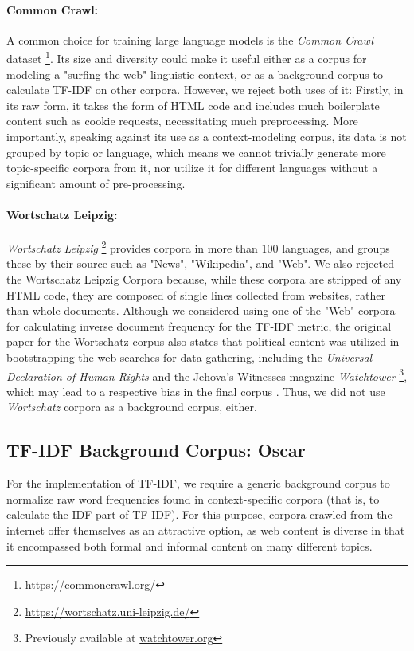 \paragraph{Common Crawl:}
A common choice for training large language models is the \textit{Common Crawl} dataset \footnote{\url{https://commoncrawl.org/}}.
Its size and diversity could make it useful either as a corpus for modeling a "surfing the web" linguistic context, or as a background corpus to calculate TF-IDF on other corpora.
However, we reject both uses of it:
Firstly, in its raw form, it takes the form of HTML code and includes much boilerplate content such as cookie requests, necessitating much preprocessing.
More importantly, speaking against its use as a context-modeling corpus, its data is not grouped by topic or language, which means we cannot trivially generate more topic-specific corpora from it, nor utilize it for different languages without a significant amount of pre-processing.

\paragraph{Wortschatz Leipzig:}
\textit{Wortschatz Leipzig} \footnote{\url{https://wortschatz.uni-leipzig.de/}} provides corpora in more than 100 languages, and groups these by their source such as "News", "Wikipedia", and "Web".
We also rejected the Wortschatz Leipzig Corpora because, while these corpora are stripped of any HTML code, they are composed of single lines collected from websites, rather than whole documents.
Although we considered using one of the "Web" corpora for calculating inverse document frequency for the TF-IDF metric, the original paper for the Wortschatz corpus also states that political content was utilized in bootstrapping the web searches for data gathering, including the \textit{Universal Declaration of Human Rights} and the Jehova's Witnesses magazine \textit{Watchtower} \footnote{Previously available at \url{watchtower.org}}, which may lead to a respective bias in the final corpus \cite{goldhahnBuildingLargeMonolingual2012}.
Thus, we did not use \textit{Wortschatz} corpora as a background corpus, either.

\subsection{TF-IDF Background Corpus: Oscar} \label{sec:oscar}
For the implementation of TF-IDF, we require a generic background corpus to normalize raw word frequencies found in context-specific corpora (that is, to calculate the IDF part of TF-IDF).
For this purpose, corpora crawled from the internet offer themselves as an attractive option, as web content is diverse in that it encompassed both formal and informal content on many different topics.

